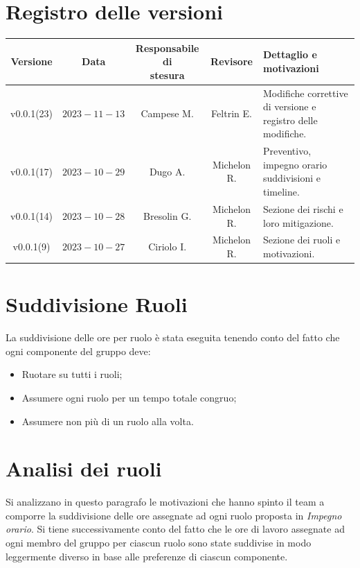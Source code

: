 \documentclass{article}
\makeatletter
\newcommand{\quantities}[1]{%
  \begin{tabular}{@{}c@{}}\strut#1\strut\end{tabular}%
}
\makeatother
\begin{document}
{\renewcommand{\arraystretch}{1.5}
\section*{Registro delle versioni}
\begin{tabularx}{\textwidth}{c|c|c|c|X}
\textbf{Versione} & \textbf{Data} & \quantities{\textbf{Responsabile di}\\\textbf{stesura}}& \textbf{Revisore} & \quantities{\textbf{Dettaglio e}\\\textbf{motivazioni}} \\
\hline
v0.0.1(23) & $2023-11-13$ & Campese M. & Feltrin E. & Modifiche correttive di versione e registro delle modifiche. \\
\hline
v0.0.1(17) & $2023-10-29$ & Dugo A.& Michelon R. & Preventivo, impegno orario suddivisioni e timeline.\\
\hline
v0.0.1(14) & $2023-10-28$ & Bresolin G. & Michelon R. & Sezione dei rischi e loro mitigazione.\\
\hline
v0.0.1(9) & $2023-10-27$ & Ciriolo I. & Michelon R. &  Sezione dei ruoli e motivazioni.\\

\end{tabularx}}
\newpage

\tableofcontents
\newpage

\section{Suddivisione Ruoli}
La suddivisione delle ore per ruolo è stata eseguita tenendo conto del fatto che ogni componente del gruppo deve:
\begin{itemize}
    \item Ruotare su tutti i ruoli;
    \item Assumere ogni ruolo per un tempo totale congruo;
    \item Assumere non più di un ruolo alla volta.
\end{itemize}

\section{Analisi dei ruoli}
Si analizzano in questo paragrafo le motivazioni che hanno spinto il team a comporre la suddivisione delle ore assegnate ad ogni ruolo proposta in \textit{Impegno orario}. Si tiene successivamente conto del fatto che le ore di lavoro assegnate ad ogni membro del gruppo per ciascun ruolo sono state suddivise in modo leggermente diverso in base alle preferenze di ciascun componente.
\end{document}

